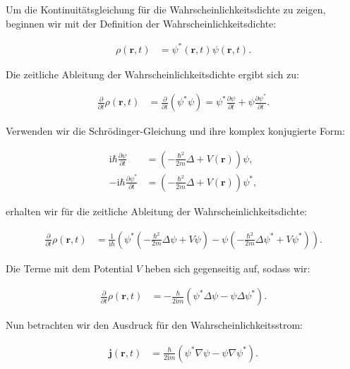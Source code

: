 Um die Kontinuitätsgleichung für die Wahrscheinlichkeitsdichte zu zeigen, beginnen wir mit der Definition der Wahrscheinlichkeitsdichte:

\begin{align*}
\rho(\mathbf{r}, t) &= \psi^*(\mathbf{r}, t) \psi(\mathbf{r}, t).
\end{align*}

Die zeitliche Ableitung der Wahrscheinlichkeitsdichte ergibt sich zu:

\begin{align*}
\frac{\partial}{\partial t} \rho(\mathbf{r}, t) &= \frac{\partial}{\partial t} (\psi^* \psi) = \psi^* \frac{\partial \psi}{\partial t} + \psi \frac{\partial \psi^*}{\partial t}.
\end{align*}

Verwenden wir die Schrödinger-Gleichung und ihre komplex konjugierte Form:

\begin{align*}
\mathrm{i} \hbar \frac{\partial \psi}{\partial t} &= \left(-\frac{\hbar^2}{2m} \Delta + V(\mathbf{r})\right) \psi, \\
-\mathrm{i} \hbar \frac{\partial \psi^*}{\partial t} &= \left(-\frac{\hbar^2}{2m} \Delta + V(\mathbf{r})\right) \psi^*,
\end{align*}

erhalten wir für die zeitliche Ableitung der Wahrscheinlichkeitsdichte:

\begin{align*}
\frac{\partial}{\partial t} \rho(\mathbf{r}, t) &= \frac{1}{\mathrm{i} \hbar} \left( \psi^* \left(-\frac{\hbar^2}{2m} \Delta \psi + V \psi \right) - \psi \left(-\frac{\hbar^2}{2m} \Delta \psi^* + V \psi^* \right) \right).
\end{align*}

Die Terme mit dem Potential \( V \) heben sich gegenseitig auf, sodass wir:

\begin{align*}
\frac{\partial}{\partial t} \rho(\mathbf{r}, t) &= -\frac{\hbar}{2 \mathrm{i} m} \left( \psi^* \Delta \psi - \psi \Delta \psi^* \right).
\end{align*}

Nun betrachten wir den Ausdruck für den Wahrscheinlichkeitsstrom:

\begin{align*}
\mathbf{j}(\mathbf{r}, t) &= \frac{\hbar}{2 \mathrm{i} m} \left( \psi^* \nabla \psi - \psi \nabla \psi^* \right).
\end{align*}

